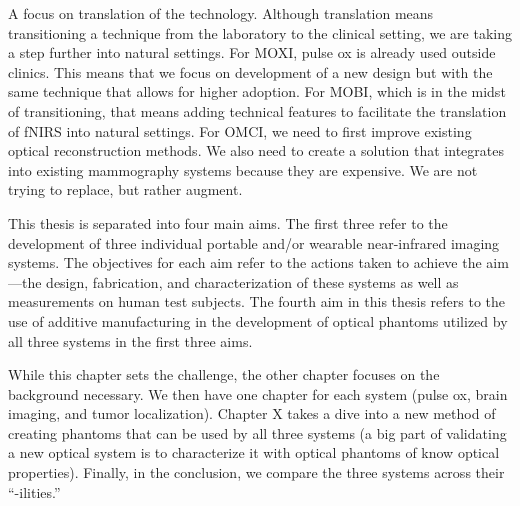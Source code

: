 A focus on translation of the technology. Although translation means transitioning a technique from the laboratory to the clinical setting, we are taking a step further into natural settings.  For MOXI, pulse ox is already used outside clinics. This means that we focus on development of a new design but with the same technique that allows for higher adoption. For MOBI, which is in the midst of transitioning, that means adding technical features to facilitate the translation of fNIRS into natural settings. For OMCI, we need to first improve existing optical reconstruction methods. We also need to create a solution that integrates into existing mammography systems because they are expensive. We are not trying to replace, but rather augment.  


This thesis is separated into four main aims. The first three refer to the development of three individual portable and/or wearable near-infrared imaging systems. The objectives for each aim refer to the actions taken to achieve the aim—the design, fabrication, and characterization of these systems as well as measurements on human test subjects. The fourth aim in this thesis refers to the use of additive manufacturing in the development of optical phantoms utilized by all three systems in the first three aims. 


While this chapter sets the challenge, the other chapter focuses on the background necessary. We then have one chapter for each system (pulse ox, brain imaging, and tumor localization). Chapter X takes a dive into a new method of creating phantoms that can be used by all three systems (a big part of validating a new optical system is to characterize it with optical phantoms of know optical properties). Finally, in the conclusion, we compare the three systems across their ``-ilities.''




